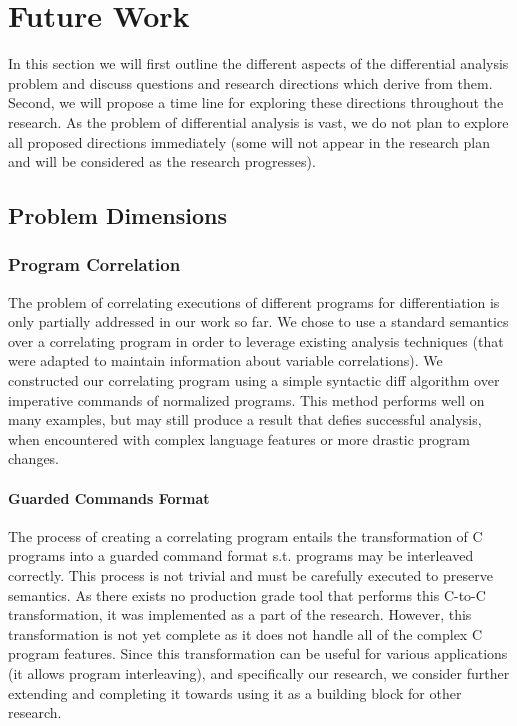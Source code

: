 \section{Future Work}

In this section we will first outline the different aspects of the differential analysis problem and discuss questions and research directions which derive from them. Second, we will propose a time line for exploring these directions throughout the research. As the problem of differential analysis is vast, we do not plan to explore all proposed directions immediately (some will not appear in the research plan and will be considered as the research progresses).

\subsection{Problem Dimensions}

\subsubsection{Program Correlation}

The problem of correlating executions of different programs for differentiation is only partially addressed in our work so far. We chose to use a standard semantics over a correlating program in order to leverage existing analysis techniques (that were adapted to maintain information about variable correlations). We constructed our correlating program using a simple syntactic diff algorithm over imperative commands of normalized programs. This method performs well on many examples, but may still produce a result that defies successful analysis, when encountered with complex language features or more drastic program changes.

\paragraph{Guarded Commands Format}
The process of creating a correlating program entails the transformation of C programs into a guarded command format s.t. programs may be interleaved correctly. This process is not trivial and must be carefully executed to preserve semantics. As there exists no production grade tool that performs this C-to-C transformation, it was implemented as a part of the research. However, this transformation is not yet complete as it does not handle all of the complex C program features. Since this transformation can be useful for various applications (it allows program interleaving), and specifically our research, we consider further extending and completing it towards using it as a building block for other research.

